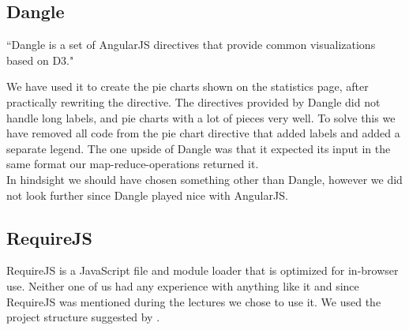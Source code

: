 \subsection{Dangle}
\label{ssec:1:dangle}
	``Dangle is a set of AngularJS directives that provide common visualizations based on D3."\cite{dangle}

	We have used it to create the pie charts shown on the statistics page, after practically rewriting the directive. The directives provided by Dangle did not handle long labels, and pie charts with a lot of pieces very well. To solve this we have removed all code from the pie chart directive that added labels and added a separate legend. The one upside of Dangle was that it expected its input in the same format our map-reduce-operations returned it. \\

	In hindsight we should have chosen something other than Dangle, however we did not look further since Dangle played nice with AngularJS. 

\subsection{RequireJS}
\label{ssec:1:requirejs}
	RequireJS is a JavaScript file and module loader that is optimized for in-browser use. Neither one of us had any experience with anything like it and since RequireJS was mentioned during the lectures we chose to use it. We used the project structure suggested by \textcite{angularjsbook}.